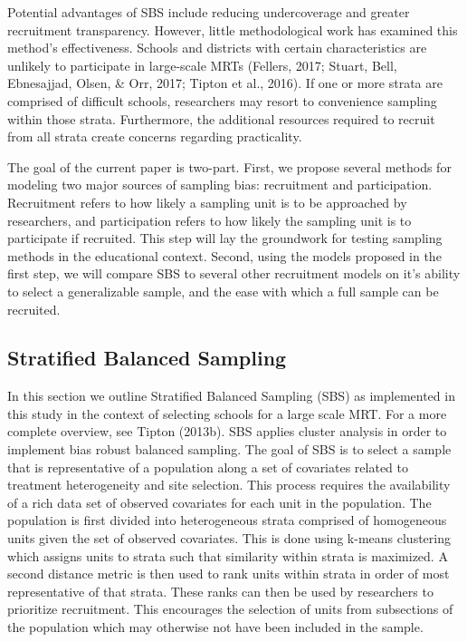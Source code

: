 \documentclass[man,floatsintext]{apa6}
\begin{document}
Potential advantages of SBS include reducing undercoverage and greater recruitment transparency. However, little methodological work has examined this method's effectiveness. Schools and districts with certain characteristics are unlikely to participate in large-scale MRTs (Fellers, 2017; Stuart, Bell, Ebnesajjad, Olsen, \& Orr, 2017; Tipton et al., 2016). If one or more strata are comprised of difficult schools, researchers may resort to convenience sampling within those strata. Furthermore, the additional resources required to recruit from all strata create concerns regarding practicality.

The goal of the current paper is two-part. First, we propose several methods for modeling two major sources of sampling bias: recruitment and participation. Recruitment refers to how likely a sampling unit is to be approached by researchers, and participation refers to how likely the sampling unit is to participate if recruited. This step will lay the groundwork for testing sampling methods in the educational context. Second, using the models proposed in the first step, we will compare SBS to several other recruitment models on it's ability to select a generalizable sample, and the ease with which a full sample can be recruited.

\hypertarget{stratified-balanced-sampling}{%
\subsection{Stratified Balanced Sampling}\label{stratified-balanced-sampling}}

In this section we outline Stratified Balanced Sampling (SBS) as implemented in this study in the context of selecting schools for a large scale MRT. For a more complete overview, see Tipton (2013b). SBS applies cluster analysis in order to implement bias robust balanced sampling. The goal of SBS is to select a sample that is representative of a population along a set of covariates related to treatment heterogeneity and site selection. This process requires the availability of a rich data set of observed covariates for each unit in the population. The population is first divided into heterogeneous strata comprised of homogeneous units given the set of observed covariates. This is done using k-means clustering which assigns units to strata such that similarity within strata is maximized. A second distance metric is then used to rank units within strata in order of most representative of that strata. These ranks can then be used by researchers to prioritize recruitment. This encourages the selection of units from subsections of the population which may otherwise not have been included in the sample.
\end{document}
